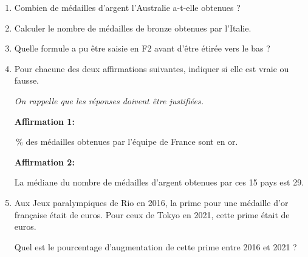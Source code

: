 \begin{enumerate}
	\item Combien de médailles d’argent l’Australie a-t-elle obtenues ?
	\item Calculer le nombre de médailles de bronze obtenues par l'Italie.
	\item Quelle formule a pu être saisie en \textsf{F2} avant d’être étirée vers le bas ?
	\item Pour chacune des deux affirmations suivantes, indiquer si elle est vraie ou fausse.

	\emph{On rappelle que les réponses doivent être justifiées.}

	\textbf{Affirmation 1:}

	\,\% des médailles obtenues par l’équipe de France sont en or. \fg{}

	\smallskip

	\textbf{Affirmation 2:}

	\og La médiane du nombre de médailles d'argent obtenues par ces 15 pays est 29. \fg{}

	\item Aux Jeux paralympiques de Rio en 2016, la prime pour une médaille d’or française était de  euros. Pour ceux de Tokyo en 2021, cette prime était de  euros.

Quel est le pourcentage d’augmentation de cette prime entre 2016 et 2021 ?

\end{enumerate}

